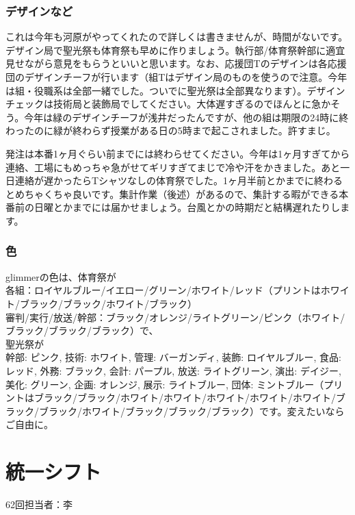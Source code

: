 \documentclass[dvipdfmx,jb5]{jreport}
\begin{document}
\subsubsection{デザインなど}
これは今年も河原がやってくれたので詳しくは書きませんが、時間がないです。デザイン局で聖光祭も体育祭も早めに作りましょう。執行部/体育祭幹部に適宜見せながら意見をもらうといいと思います。なお、応援団Tのデザインは各応援団のデザインチーフが行います（組Tはデザイン局のものを使うので注意。今年は組・役職系は全部一緒でした。ついでに聖光祭は全部異なります）。デザインチェックは技術局と装飾局でしてください。大体遅すぎるのでほんとに急かそう。今年は緑のデザインチーフが浅井だったんですが、他の組は期限の24時に終わったのに緑が終わらず授業がある日の5時まで起こされました。許すまじ。

発注は本番1ヶ月ぐらい前までには終わらせてください。今年は1ヶ月すぎてから連絡、工場にもめっちゃ急がせてギリすぎてまじで冷や汗をかきました。あと一日連絡が遅かったらTシャツなしの体育祭でした。1ヶ月半前とかまでに終わるとめちゃくちゃ良いです。集計作業（後述）があるので、集計する暇ができる本番前の日曜とかまでには届かせましょう。台風とかの時期だと結構遅れたりします。

\subsubsection{色}
glimmerの色は、体育祭が\\
各組：ロイヤルブルー/イエロー/グリーン/ホワイト/レッド（プリントはホワイト/ブラック/ブラック/ホワイト/ブラック）\\
審判/実行/放送/幹部：ブラック/オレンジ/ライトグリーン/ピンク（ホワイト/ブラック/ブラック/ブラック）で、\\
聖光祭が\\
幹部: ピンク, 技術: ホワイト, 管理: バーガンディ, 装飾: ロイヤルブルー, 食品: レッド, 外務: ブラック, 会計: パープル, 放送: ライトグリーン, 演出: デイジー, 美化: グリーン, 企画: オレンジ, 展示: ライトブルー, 団体: ミントブルー（プリントはブラック/ブラック/ホワイト/ホワイト/ホワイト/ホワイト/ホワイト/ブラック/ブラック/ホワイト/ブラック/ブラック/ブラック）です。変えたいならご自由に。


\section{統一シフト}\label{sec:統一シフト}
62回担当者：李
\end{document}
